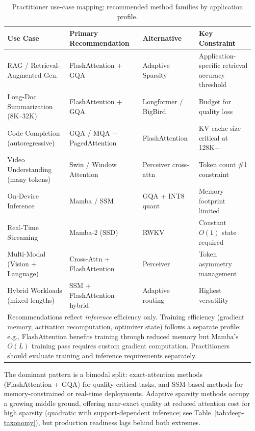 \documentclass[10pt,twocolumn]{article}
\newif\ifshrinkfloats
\newcommand{\sflt}[2]{\ifshrinkfloats#1\else#2\fi}
\begin{document}
\begin{table}[!tbp]
\centering
\sflt{\fontsize{11.8}{14.2}\selectfont}{\footnotesize}
\renewcommand{\arraystretch}{\sflt{2.25}{1.5}}
\caption{Practitioner use-case mapping: recommended method families by application profile.}
\label{tab:use-cases}
\begin{tabular}{p{2.5cm}p{2.5cm}p{2.5cm}p{3.0cm}}
\toprule
Use Case & Primary Recommendation & Alternative & Key Constraint \\
\midrule
RAG / Retrieval-Augmented Gen. & FlashAttention + GQA & Adaptive Sparsity & Application-specific retrieval accuracy threshold \\
Long-Doc Summarization (8K--32K) & FlashAttention + GQA & Longformer / BigBird & Budget for quality loss \\
Code Completion (autoregressive) & GQA / MQA + PagedAttention & FlashAttention   & KV cache size critical at 128K+ \\
Video Understanding (many tokens) & Swin / Window Attention & Perceiver cross-attn & Token count \#1 constraint \\
On-Device Inference            & Mamba / SSM & GQA + INT8 quant  & Memory footprint limited \\
Real-Time Streaming            & Mamba-2 (SSD) & RWKV              & Constant $O(1)$ state required \\
Multi-Modal (Vision + Language) & Cross-Attn + FlashAttention & Perceiver & Token asymmetry management \\
Hybrid Workloads (mixed lengths) & SSM + FlashAttention hybrid & Adaptive routing & Highest versatility \\
\bottomrule
\multicolumn{4}{p{\dimexpr2.0cm+1.5cm+2.3cm+1.5cm+1.6cm+1.5cm+12\tabcolsep\relax}}{\scriptsize Recommendations reflect \textit{inference} efficiency only. Training efficiency (gradient memory, activation recomputation, optimizer state) follows a separate profile: e.g., FlashAttention benefits training through reduced memory but Mamba's $O(L)$ training pass requires custom gradient computation. Practitioners should evaluate training and inference requirements separately.}
\end{tabular}
\end{table}

\noindent The dominant pattern is a bimodal split: exact-attention methods (FlashAttention + GQA) for quality-critical tasks, and SSM-based methods for memory-constrained or real-time deployments. Adaptive sparsity methods occupy a growing middle ground, offering near-exact quality at reduced attention cost for high sparsity (quadratic with support-dependent inference; see Table~\ref{tab:deep-taxonomy}), but production readiness lags behind both extremes.
\end{document}
